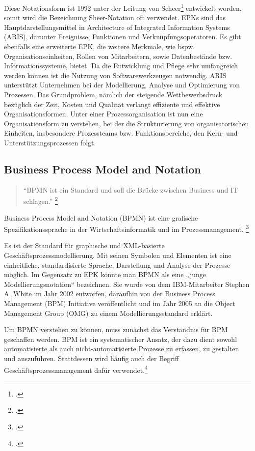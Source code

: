 Diese Notationsform ist 1992 unter der Leitung von
Scheer\footcite[Vgl.][]{scheer} entwickelt worden, somit wird die Bezeichnung
Sheer-Notation oft verwendet.
EPKs sind das Hauptdarstellungsmittel in Architecture of Integrated 
Information Systems (ARIS), darunter Ereignisse, 
Funktionen und Verknüpfungsoperatoren. Es gibt ebenfalls eine erweiterte EPK, 
die weitere Merkmale, wie bspw. Organisationseinheiten, Rollen von Mitarbeitern, 
sowie Datenbestände bzw. Informationssysteme, bietet. 
Da die Entwicklung und Pflege sehr umfangreich werden können ist die 
Nutzung von Softwarewerkzeugen notwendig. 
ARIS unterstützt Unternehmen bei der Modellierung, Analyse und Optimierung von Prozessen.
Das Grundproblem, nämlich der steigende Wettbewerbsdruck bezüglich der Zeit, 
Kosten und Qualität verlangt effiziente und effektive Organisationsformen. 
Unter einer Prozessorganisation ist nun eine Organisationsform zu verstehen, 
bei der die Strukturierung von organisatorischen Einheiten, 
insbesondere  Prozessteams bzw. Funktionsbereiche, 
den Kern- und Unterstützungsprozessen folgt.

\subsection{Business Process Model and Notation}

\begin{quote}
"`BPMN ist ein Standard und soll die Brücke zwischen Business und IT schlagen."'
\footcite[Vgl.][]{praxishandbuch:bpmn2}
\end{quote}

Business Process Model and Notation (BPMN) ist eine grafische 
Spezifikationssprache in der Wirtschaftsinformatik und im Prozessmanagement.
\footcite[Vgl.][]{allweyer}

Es ist der Standard für graphische und XML-basierte
Geschäftsprozessmodellierung. 
Mit seinen Symbolen und Elementen ist eine einheitliche, standardisierte Sprache,
Darstellung und Analyse der Prozesse möglich. 
Im Gegensatz zu EPK könnte man BPMN als eine „junge Modellierungsnotation“ bezeichnen. 
Sie wurde von dem IBM-Mitarbeiter Stephen A. White im Jahr 2002 entworfen, 
daraufhin von der Business Process Management (BPM) 
Initiative veröffentlicht und im Jahr 2005 an die Object Management Group (OMG) 
zu einem Modellierungsstandard erklärt.

Um BPMN verstehen zu können, muss zunächst das Verständnis für BPM geschaffen
werden. BPM ist ein systematischer Ansatz, der
dazu dient sowohl automatisierte als auch nicht-automatisierte 
Prozesse zu erfassen, zu gestalten und auszuführen. 
Stattdessen wird häufig auch der Begriff Geschäftsprozessmanagement dafür
verwendet.\footcite[S.1]{praxishandbuch:bpmn2}
 
